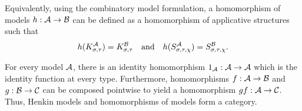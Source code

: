 Equivalently, using the combinatory model formulation, a homomorphism of models $h : \mathcal{A} \to \mathcal{B}$ can be defined as a homomorphism of applicative structures such that
\[ h(K^{\mathcal{A}}_{\sigma,\tau}) = K^{\mathcal{B}}_{\sigma,\tau} \quad\text{and}\quad
    h(S^{\mathcal{A}}_{\sigma,\tau,\chi}) = S^{\mathcal{B}}_{\sigma,\tau,\chi}. \]


For every model $\mathcal{A}$, there is an identity homomorphism $\id[\struct{A}] : \struct{A} \to \struct{A}$ which is the identity function at every type. Furthermore, homomorphisms $f : \mathcal{A} \to \mathcal{B}$ and $g : \mathcal{B} \to \mathcal{C}$ can be composed pointwise to yield a homomorphism $gf : \mathcal{A} \to \mathcal{C}$. Thus, Henkin models and homomorphisms of models form a category.

\begin{comment}
How useful is this example?
\begin{ex}
Let $X = (X_\beta)_{\beta \in \Basetypes}$ and $Y = (Y_\beta)_{\beta \in \Basetypes}$ be to families of sets indexed by base types, and suppose we have a family of bijections $(p_\beta : X_\beta \to Y_\beta)_{\beta \in \Basetypes}$ between the corresponding sets. This gives rise to a homomorphism $\stdmod{p} : \stdmod{X} \to \stdmod{Y}$ from the standard model over $X$ to the standard model over Y. The maps $\stdmod{p}_\sigma$ are defined by recursion on types:
\begin{align*}
\stdmod{p}_\beta(x) &= p_\beta(x) \\
\stdmod{p}_{\functy{\sigma}{\tau}}(f) &= \stdmod{p}_\tau \circ f \circ (\stdmod{p}_\sigma)^{-1}
\end{align*}
\end{ex}
\end{comment}
